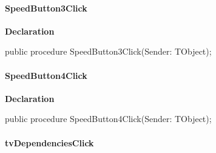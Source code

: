 \documentclass{report}
\newif\ifpdf
\begin{document}
\paragraph*{SpeedButton3Click}\hspace*{\fill}

\label{prjwizard.TfrmProjectWizard-SpeedButton3Click}
\begin{list}{}{
\setlength{\itemindent}{0cm}
\setlength{\listparindent}{0cm}
\setlength{\leftmargin}{\evensidemargin}
\addtolength{\leftmargin}{\tmplength}
\settowidth{\labelsep}{X}
\addtolength{\leftmargin}{\labelsep}
\setlength{\labelwidth}{\tmplength}
}
\item[\textbf{Declaration}\hfill]
\ifpdf
\begin{flushleft}
\fi
\begin{ttfamily}
public procedure SpeedButton3Click(Sender: TObject);\end{ttfamily}

\ifpdf
\end{flushleft}
\fi

\end{list}
\paragraph*{SpeedButton4Click}\hspace*{\fill}

\label{prjwizard.TfrmProjectWizard-SpeedButton4Click}
\begin{list}{}{
\setlength{\itemindent}{0cm}
\setlength{\listparindent}{0cm}
\setlength{\leftmargin}{\evensidemargin}
\addtolength{\leftmargin}{\tmplength}
\settowidth{\labelsep}{X}
\addtolength{\leftmargin}{\labelsep}
\setlength{\labelwidth}{\tmplength}
}
\item[\textbf{Declaration}\hfill]
\ifpdf
\begin{flushleft}
\fi
\begin{ttfamily}
public procedure SpeedButton4Click(Sender: TObject);\end{ttfamily}

\ifpdf
\end{flushleft}
\fi

\end{list}
\paragraph*{tvDependenciesClick}\hspace*{\fill}
\end{document}
